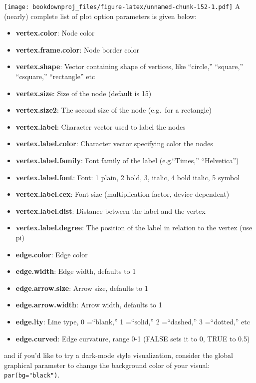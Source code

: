 \documentclass[
]{article}
\providecommand{\tightlist}{%
  \setlength{\itemsep}{0pt}\setlength{\parskip}{0pt}}
\theoremstyle{definition}
\theoremstyle{definition}
\theoremstyle{definition}
\theoremstyle{definition}
\theoremstyle{remark}
\begin{document}
\texttt{[image: bookdownproj\_files/figure-latex/unnamed-chunk-152-1.pdf]}
A (nearly) complete list of plot option parameters is given below:

\begin{itemize}
\tightlist
\item
  \textbf{vertex.color}: Node color
\item
  \textbf{vertex.frame.color}: Node border color
\item
  \textbf{vertex.shape}: Vector containing shape of vertices, like ``circle,'' ``square,'' ``csquare,'' ``rectangle'' etc
\item
  \textbf{vertex.size}: Size of the node (default is 15)
\item
  \textbf{vertex.size2}: The second size of the node (e.g.~for a rectangle)
\item
  \textbf{vertex.label}: Character vector used to label the nodes
\item
  \textbf{vertex.label.color}: Character vector specifying color the nodes
\item
  \textbf{vertex.label.family}: Font family of the label (e.g.``Times,'' ``Helvetica'')
\item
  \textbf{vertex.label.font}: Font: 1 plain, 2 bold, 3, italic, 4 bold italic, 5 symbol
\item
  \textbf{vertex.label.cex}: Font size (multiplication factor, device-dependent)
\item
  \textbf{vertex.label.dist}: Distance between the label and the vertex
\item
  \textbf{vertex.label.degree}: The position of the label in relation to the vertex (use pi)
\item
  \textbf{edge.color}: Edge color
\item
  \textbf{edge.width}: Edge width, defaults to 1
\item
  \textbf{edge.arrow.size}: Arrow size, defaults to 1
\item
  \textbf{edge.arrow.width}: Arrow width, defaults to 1
\item
  \textbf{edge.lty}: Line type, 0 =``blank,'' 1 =``solid,'' 2 =``dashed,'' 3 =``dotted,'' etc
\item
  \textbf{edge.curved}: Edge curvature, range 0-1 (FALSE sets it to 0, TRUE to 0.5)
\end{itemize}

and if you'd like to try a dark-mode style visualization, consider the global graphical parameter to change the background color of your visual: \texttt{par(bg="black")}.
\end{document}
